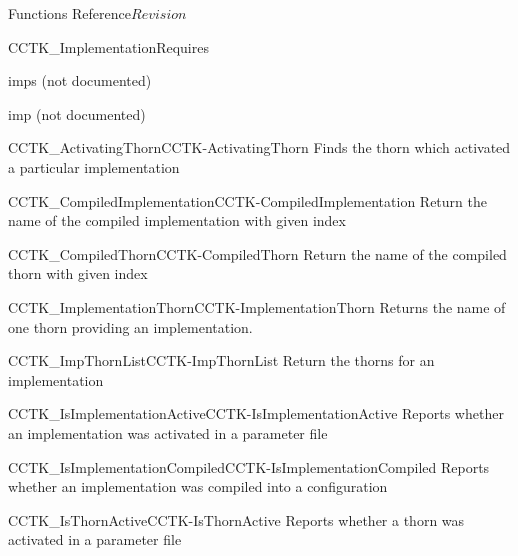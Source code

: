 \begin{cactuspart}{ Functions Reference}{}{$Revision$}
\begin{FunctionDescription}{CCTK\_ImplementationRequires}
\begin{ResultSection}
\begin{Result}{imps}
(not documented)
\end{Result}
\end{ResultSection}

\begin{ParameterSection}
\begin{Parameter}{imp}
(not documented)
\end{Parameter}
\end{ParameterSection}


\begin{SeeAlsoSection}
\begin{SeeAlso2}{CCTK\_ActivatingThorn}{CCTK-ActivatingThorn}
  Finds the thorn which activated a particular implementation
\end{SeeAlso2}
\begin{SeeAlso2}{CCTK\_CompiledImplementation}{CCTK-CompiledImplementation}
  Return the name of the compiled implementation with given index
\end{SeeAlso2}
\begin{SeeAlso2}{CCTK\_CompiledThorn}{CCTK-CompiledThorn}
  Return the name of the compiled thorn with given index
\end{SeeAlso2}
\begin{SeeAlso2}{CCTK\_ImplementationThorn}{CCTK-ImplementationThorn}
  Returns the name of one thorn providing an implementation.
\end{SeeAlso2}
\begin{SeeAlso2}{CCTK\_ImpThornList}{CCTK-ImpThornList}
  Return the thorns for an implementation
\end{SeeAlso2}
\begin{SeeAlso2}{CCTK\_IsImplementationActive}{CCTK-IsImplementationActive}
  Reports whether an implementation was activated in a parameter file
\end{SeeAlso2}
\begin{SeeAlso2}{CCTK\_IsImplementationCompiled}{CCTK-IsImplementationCompiled}
  Reports whether an implementation was compiled into a configuration
\end{SeeAlso2}
\begin{SeeAlso2}{CCTK\_IsThornActive}{CCTK-IsThornActive}
  Reports whether a thorn was activated in a parameter file
\end{SeeAlso2}

\end{SeeAlsoSection}
\end{FunctionDescription}
\end{cactuspart}
